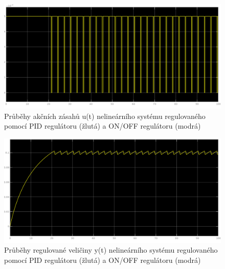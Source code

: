 \documentclass{article}
\begin{document}
\begin{table}[H]
\centering
{}
\caption{Nastavení bloku Relay s hysterezí}
\label{tab:nastaveni_relay}
\end{table}

\begin{figure}[H]
\includegraphics[width=\textwidth]{ukol6u}
\centering
\caption{Průběhy akčních zásahů u(t) nelineárního systému regulovaného pomocí PID regulátoru (žlutá) a ON/OFF regulátoru (modrá)}
\label{img:ut_onoff}
\end{figure}


\begin{figure}[H]
\includegraphics[width=\textwidth]{ukol6y}
\centering
\caption{Průběhy regulované veličiny y(t) nelineárního systému regulovaného pomocí PID regulátoru (žlutá) a ON/OFF regulátoru (modrá)}
\label{img:yt_onoff}
\end{figure}
\end{document}
